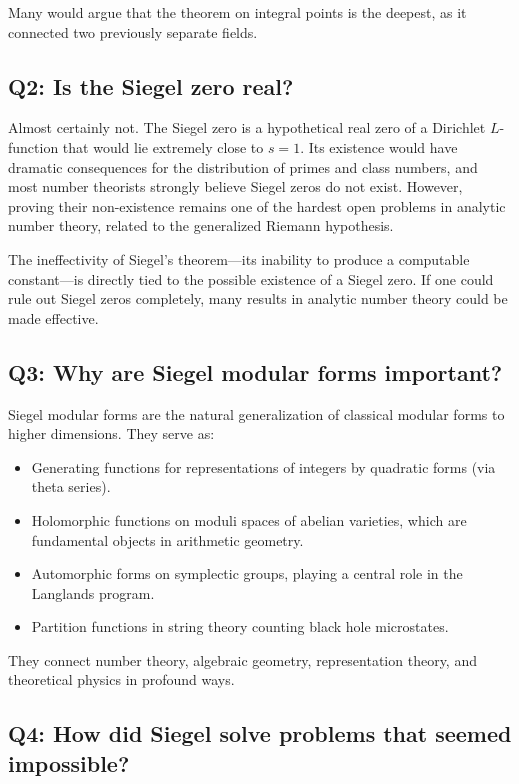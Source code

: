 Many would argue that the theorem on integral points is the deepest, as it connected two previously separate fields.

\subsection*{Q2: Is the Siegel zero real?}

Almost certainly not. The Siegel zero is a hypothetical real zero of a Dirichlet $L$-function that would lie extremely close to $s = 1$. Its existence would have dramatic consequences for the distribution of primes and class numbers, and most number theorists strongly believe Siegel zeros do not exist. However, proving their non-existence remains one of the hardest open problems in analytic number theory, related to the generalized Riemann hypothesis.

The ineffectivity of Siegel's theorem---its inability to produce a computable constant---is directly tied to the possible existence of a Siegel zero. If one could rule out Siegel zeros completely, many results in analytic number theory could be made effective.

\subsection*{Q3: Why are Siegel modular forms important?}

Siegel modular forms are the natural generalization of classical modular forms to higher dimensions. They serve as:
\begin{itemize}
    \item Generating functions for representations of integers by quadratic forms (via theta series).
    \item Holomorphic functions on moduli spaces of abelian varieties, which are fundamental objects in arithmetic geometry.
    \item Automorphic forms on symplectic groups, playing a central role in the Langlands program.
    \item Partition functions in string theory counting black hole microstates.
\end{itemize}
They connect number theory, algebraic geometry, representation theory, and theoretical physics in profound ways.

\subsection*{Q4: How did Siegel solve problems that seemed impossible?}

